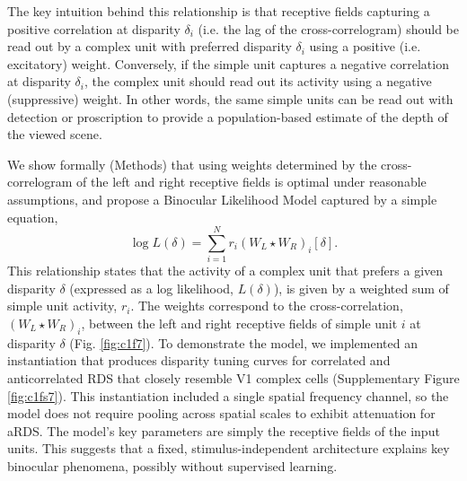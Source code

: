The key intuition behind this relationship is that receptive fields capturing a positive correlation at disparity $\delta_{i}$ (i.e. the lag of the cross-correlogram) should be read out by a complex unit with preferred disparity $\delta_{i}$ using a positive (i.e. excitatory) weight. Conversely, if the simple unit captures a negative correlation at disparity $\delta_{i}$, the complex unit should read out its activity using a negative (suppressive) weight. In other words, the same simple units can be read out with detection or proscription to provide a population-based estimate of the depth of the viewed scene.


We show formally (Methods) that using weights determined by the cross-correlogram of the left and right receptive fields is optimal under reasonable assumptions, and propose a Binocular Likelihood Model captured by a simple equation,
\[
\log L(\delta) = \sum_{i=1}^N r_i (W_L \star W_R)_i [\delta].
\]
This relationship states that the activity of a complex unit that prefers a given disparity $\delta$ (expressed as a log likelihood, $L(\delta)$), is given by a weighted sum of simple unit activity, $r_i$. The weights correspond to the cross-correlation, $(W_L \star W_R)_i$, between the left and right receptive fields of simple unit $i$ at disparity $\delta$ (Fig. \ref{fig:c1f7}). To demonstrate the model, we implemented an instantiation that produces disparity tuning curves for correlated and anticorrelated RDS that closely resemble V1 complex cells (Supplementary Figure \ref{fig:c1fs7}). This instantiation included a single spatial frequency channel, so the model does not require pooling across spatial scales to exhibit attenuation for aRDS. The model's key parameters are simply the receptive fields of the input units. This suggests that a fixed, stimulus-independent architecture explains key binocular phenomena, possibly without supervised learning.  


